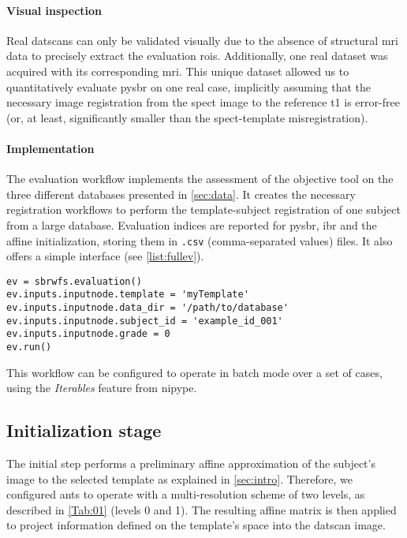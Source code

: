 \documentclass{frontiers}
\begin{document}
\paragraph{Visual inspection} %
Real \glspl*{datscan} can only be validated visually due to the 
  absence of structural \gls*{mri} data to precisely extract
  the evaluation \glspl*{roi}.
Additionally, one real dataset was acquired with its corresponding \gls*{mri}.
This unique dataset allowed us to quantitatively evaluate \gls*{pysbr} on one real case,
  implicitly assuming that the necessary image registration from the 
  \gls*{spect} image to the reference \gls*{t1} is error-free 
  (or, at least, significantly smaller than the \gls*{spect}-template misregistration).

\paragraph{Implementation} %
The evaluation workflow implements the assessment of the objective tool on the three different
  databases presented in \autoref{sec:data}. 
It creates the necessary registration workflows to perform the template-subject 
  registration of one subject from a large database.
Evaluation indices are reported for \gls*{pysbr}, \gls*{ibr} and the affine initialization,
  storing them in \texttt{.csv} (comma-separated values) files. 
It also offers a simple interface (see \autoref{list:fullev}).
\begin{lstlisting}[float,caption={\label{list:fullev}Running the evaluation pipeline}]
ev = sbrwfs.evaluation()
ev.inputs.inputnode.template = 'myTemplate'
ev.inputs.inputnode.data_dir = '/path/to/database'
ev.inputs.inputnode.subject_id = 'example_id_001'
ev.inputs.inputnode.grade = 0
ev.run()
\end{lstlisting}
\noindent 
This workflow can be configured to operate in batch mode over a
  set of cases, using the \emph{Iterables} feature from \gls*{nipype}.

\subsection{Initialization stage}
\label{sec:meth_initialization}
The initial step performs a preliminary affine approximation of the subject's
  image to the selected template as explained in \autoref{sec:intro}.
Therefore, we configured \gls*{ants} to operate with a multi-resolution scheme
  of two levels, as described in \autoref{Tab:01} (levels 0 and 1).
The resulting affine matrix is then applied to project information defined on
  the template's space into the \gls*{datscan} image.
\end{document}
